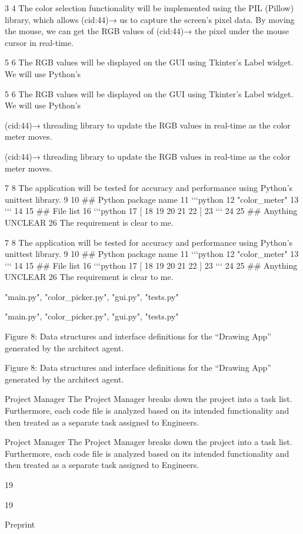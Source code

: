\documentclass[12pt]{article}
\begin{document}
3
4 The color selection functionality will be implemented using the PIL (Pillow) library, which allows
(cid:44)→ us to capture the screen’s pixel data. By moving the mouse, we can get the RGB values of
(cid:44)→ the pixel under the mouse cursor in real-time.


5
6 The RGB values will be displayed on the GUI using Tkinter’s Label widget. We will use Python’s


5
6 The RGB values will be displayed on the GUI using Tkinter’s Label widget. We will use Python’s


(cid:44)→ threading library to update the RGB values in real-time as the color meter moves.


(cid:44)→ threading library to update the RGB values in real-time as the color meter moves.


7
8 The application will be tested for accuracy and performance using Python’s unittest library.
9
10 ## Python package name
11 ‘‘‘python
12 "color_meter"
13 ‘‘‘
14
15 ## File list
16 ‘‘‘python
17 [
18
19
20
21
22 ]
23 ‘‘‘
24
25 ## Anything UNCLEAR
26 The requirement is clear to me.


7
8 The application will be tested for accuracy and performance using Python’s unittest library.
9
10 \#\# Python package name
11 ‘‘‘python
12 "color\_meter"
13 ‘‘‘
14
15 \#\# File list
16 ‘‘‘python
17 [
18
19
20
21
22 ]
23 ‘‘‘
24
25 \#\# Anything UNCLEAR
26 The requirement is clear to me.


"main.py",
"color_picker.py",
"gui.py",
"tests.py"


"main.py",
"color\_picker.py",
"gui.py",
"tests.py"


Figure 8: Data structures and interface definitions for the “Drawing App” generated by the architect
agent.


Figure 8: Data structures and interface definitions for the “Drawing App” generated by the architect
agent.


Project Manager The Project Manager breaks down the project into a task list. Furthermore, each
code file is analyzed based on its intended functionality and then treated as a separate task assigned
to Engineers.


Project Manager The Project Manager breaks down the project into a task list. Furthermore, each
code file is analyzed based on its intended functionality and then treated as a separate task assigned
to Engineers.


19


19


Preprint
\end{document}
